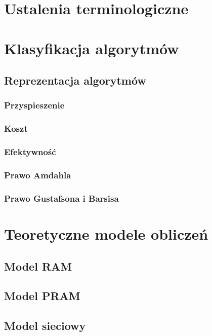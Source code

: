 \section{Ustalenia terminologiczne}


\newpage

\section{Klasyfikacja algorytmów}


\subsection{Reprezentacja algorytmów}



\subsubsection{Przyspieszenie}


\subsubsection{Koszt}


\subsubsection{Efektywność}


\subsubsection{Prawo Amdahla}


\subsubsection{Prawo Gustafsona i Barsisa}


\newpage

\section{Teoretyczne modele obliczeń}

\subsection{Model RAM}


\label{subsec:PRAM}
\subsection{Model PRAM}


\subsection{Model sieciowy}

